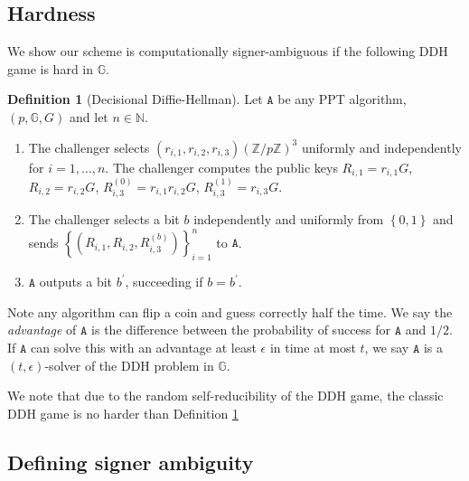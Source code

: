 \documentclass{mrl}
\theoremstyle{plain}
\theoremstyle{definition}
\newtheorem{defn}{Definition}[section]
\begin{document}
\subsection{Hardness}

We show our scheme is computationally signer-ambiguous if the following DDH game is hard in $\mathbb{G}$.

\begin{defn}[Decisional Diffie-Hellman]\label{ddhgame} Let $\texttt{A}$ be any PPT algorithm, $(p, \mathbb{G}, G)$ and let $n \in \mathbb{N}$.
\begin{enumerate}
\item The challenger selects $(r_{i,1}, r_{i,2}, r_{i,3}) \left(\mathbb{Z}/p\mathbb{Z}\right)^3$ uniformly and independently for $i=1, \ldots, n$. The challenger computes the public keys $R_{i,1} = r_{i,1} G$, $R_{i,2} = r_{i,2}G$, $R_{i,3}^{(0)} = r_{i,1} r_{i,2} G$, $R_{i,3}^{(1)} = r_{i,3} G$.

\item The challenger selects a bit $b$ independently and uniformly from $\left\{0,1\right\}$ and sends $\left\{(R_{i,1}, R_{i,2}, R_{i,3}^{(b)})\right\}_{i=1}^{n}$ to $\texttt{A}$.

\item $\texttt{A}$ outputs a bit $b^\prime$, succeeding if $b = b^\prime$.
\end{enumerate}

Note any algorithm can flip a coin and guess correctly half the time. We say the \textit{advantage} of $\texttt{A}$ is the difference between the probability of success for $\texttt{A}$ and $1/2$. If $\texttt{A}$ can solve this with an advantage at least $\epsilon$ in time at most $t$, we say $\texttt{A}$ is a $(t,\epsilon)$-solver of the DDH problem in $\mathbb{G}$. 

\end{defn}


We note that due to the random self-reducibility of the DDH game, the classic DDH game is no harder than Definition \ref{ddhgame}
\subsection{Defining signer ambiguity}
\end{document}
